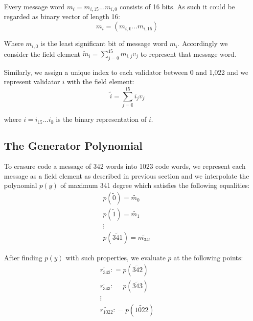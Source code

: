 Every message word $m_i=m_{i, 15} \ldots m_{i, 0}$ consists of 16 bits. As such it could be regarded as binary vector of length 16:
\begin{equation}
m_i = (m_{i, 0} \ldots m_{i, 15})
\end{equation}

Where $m_{i, 0}$ is the least significant bit of message word $m_i$. Accordingly we consider the field element $\tilde{m}_i = \sum^{15}_{j = 0} m_{i, j} v_j$ to represent that message word.

Similarly, we assign a unique index to each validator between 0 and 1,022 and we represent validator $i$ with the field element:
\begin{equation}
\tilde{i} = \sum^{15}_{j = 0} i_j v_j
\end{equation}

where $i = i_{15} \ldots i_0$ is the binary representation of $i$.

\subsection{The Generator Polynomial}

To erasure code a message of 342 words into 1023 code words, we represent each message as a field element as described in previous section and we interpolate the polynomial $p(y)$ of maximum 341 degree which satisfies the following equalities:
\begin{equation}
   \begin{array}{l}
     p (\tilde{0}) = \widetilde{m_0}\\
     p (\tilde{1}) = \widetilde{m_1}\\
     \vdots\\
     p (\widetilde{341}) = \widetilde{m_{341}}
   \end{array}
\end{equation}

After finding $p(y)$ with such properties, we evaluate $p$ at the following points:
\begin{equation}
   \begin{array}{l}
     \widetilde{r_{342}} : = p (\widetilde{342})\\
     \widetilde{r_{343}} : = p (\widetilde{343})\\
     \vdots\\
     \widetilde{r_{1022}} : = p (\widetilde{1022})
   \end{array}
\end{equation}

